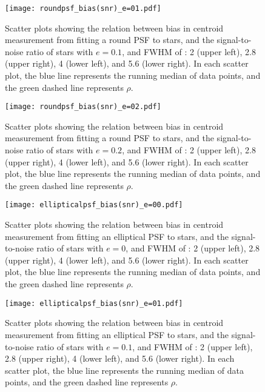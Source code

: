 \documentclass[12pt, preprint]{aastex}
\begin{document}
\begin{figure}[!htb]
  \texttt{[image: roundpsf\_bias(snr)\_e=01.pdf]}
\endminipage
\caption{Scatter plots showing the relation between bias in centroid measurement from fitting a round PSF to stars, and the signal-to-noise ratio of stars with $e=0.1$, and FWHM of : 2 (upper left), 2.8 (upper right), 4 (lower left), and 5.6 (lower right). In each scatter plot, the blue line represents the running median of data points, and the green dashed line represents $\rho$.}\label{11}
\end{figure}

\begin{figure}[!htb]
  \texttt{[image: roundpsf\_bias(snr)\_e=02.pdf]}
\endminipage
\caption{Scatter plots showing the relation between bias in centroid measurement from fitting a round PSF to stars, and the signal-to-noise ratio of stars with $e=0.2$, and FWHM of : 2 (upper left), 2.8 (upper right), 4 (lower left), and 5.6 (lower right). In each scatter plot, the blue line represents the running median of data points, and the green dashed line represents $\rho$.}\label{12}
\end{figure}

\begin{figure}[!htb]
  \texttt{[image: ellipticalpsf\_bias(snr)\_e=00.pdf]}
\endminipage
\caption{Scatter plots showing the relation between bias in centroid measurement from fitting an elliptical PSF to stars, and the signal-to-noise ratio of stars with $e=0$, and FWHM of : 2 (upper left), 2.8 (upper right), 4 (lower left), and 5.6 (lower right). In each scatter plot, the blue line represents the running median of data points, and the green dashed line represents $\rho$.}\label{13}
\end{figure}

\begin{figure}[!htb]
  \texttt{[image: ellipticalpsf\_bias(snr)\_e=01.pdf]}
\endminipage
\caption{Scatter plots showing the relation between bias in centroid measurement from fitting an elliptical PSF to stars, and the signal-to-noise ratio of stars with $e=0.1$, and FWHM of : 2 (upper left), 2.8 (upper right), 4 (lower left), and 5.6 (lower right). In each scatter plot, the blue line represents the running median of data points, and the green dashed line represents $\rho$.}\label{14}
\end{figure}
\end{document}

